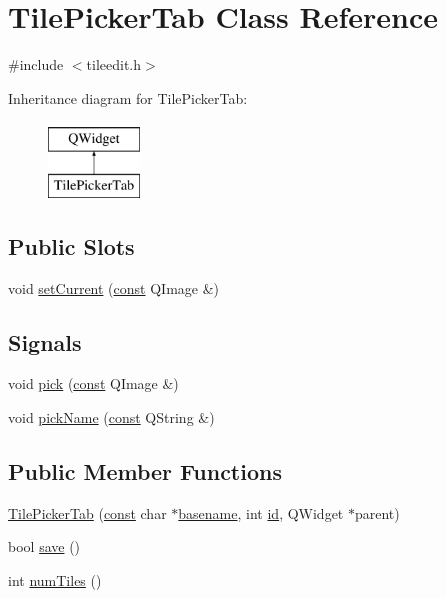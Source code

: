 \hypertarget{classTilePickerTab}{\section{Tile\+Picker\+Tab Class Reference}
\label{classTilePickerTab}
}


{\ttfamily \#include $<$tileedit.\+h$>$}

Inheritance diagram for Tile\+Picker\+Tab\+:\begin{figure}[H]
\begin{center}
\leavevmode
\includegraphics[height=2.000000cm]{classTilePickerTab}
\end{center}
\end{figure}
\subsection*{Public Slots}
\begin{DoxyCompactItemize}
\item 
void \hyperlink{classTilePickerTab_a99e8e955bb0d3dfdbf93b71aa7d43246}{set\+Current} (\hyperlink{tradstdc_8h_a2c212835823e3c54a8ab6d95c652660e}{const} Q\+Image \&)
\end{DoxyCompactItemize}
\subsection*{Signals}
\begin{DoxyCompactItemize}
\item 
void \hyperlink{classTilePickerTab_ab423462ae7c9eb68f6bc7c10de001616}{pick} (\hyperlink{tradstdc_8h_a2c212835823e3c54a8ab6d95c652660e}{const} Q\+Image \&)
\item 
void \hyperlink{classTilePickerTab_aeeb0a537613a0817edb3cc200f75d031}{pick\+Name} (\hyperlink{tradstdc_8h_a2c212835823e3c54a8ab6d95c652660e}{const} Q\+String \&)
\end{DoxyCompactItemize}
\subsection*{Public Member Functions}
\begin{DoxyCompactItemize}
\item 
\hyperlink{classTilePickerTab_a87c611363ff44f94e244146e61161173}{Tile\+Picker\+Tab} (\hyperlink{tradstdc_8h_a2c212835823e3c54a8ab6d95c652660e}{const} char $\ast$\hyperlink{winreq_8c_a817969c4fe20a121e99fda658e88fbc7}{basename}, int \hyperlink{classTilePickerTab_ab8494dd5699dc9f7e6851db4101f2087}{id}, Q\+Widget $\ast$parent)
\item 
bool \hyperlink{classTilePickerTab_a6fe16129aa749280e99ba8a363f4477b}{save} ()
\item 
int \hyperlink{classTilePickerTab_a48ba46454a5ea2e9accdbdf7aae6a50c}{num\+Tiles} ()
\end{DoxyCompactItemize}

